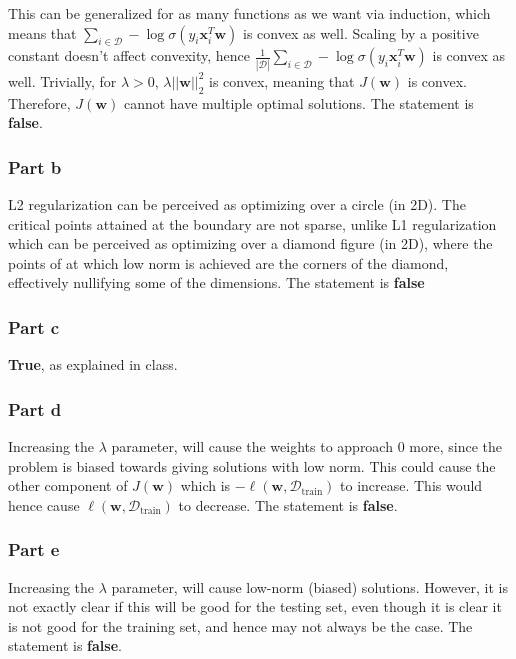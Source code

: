 \documentclass{article}
\newcommand{\vct}[1]{\mathbf{#1}}
\begin{document}
\begin{flushleft}
This can be generalized for as many functions as we want via induction, which means that \(\displaystyle\sum_{i \in \mathcal{D}} -\log \sigma(y_{i}\vct{x}_{i}^{T}\vct{w})\) is convex as well. Scaling by a positive constant doesn't affect convexity, hence \(\displaystyle\frac{1}{|\mathcal{D}|}\sum_{i \in \mathcal{D}} -\log \sigma(y_{i}\vct{x}_{i}^{T}\vct{w})\) is convex as well. Trivially, for \(\lambda > 0\), \(\lambda ||\vct{w}||_{2}^{2}\) is convex, meaning that \(J(\vct{w})\) is convex. Therefore, \(J(\vct{w})\) cannot have multiple optimal solutions. The statement is \textbf{false}.
\end{flushleft}

\subsubsection*{Part b}
L2 regularization can be perceived as optimizing over a circle (in 2D). The critical points attained at the boundary are not sparse, unlike L1 regularization which can be perceived as optimizing over a diamond figure (in 2D), where the points of at which low norm is achieved are the corners of the diamond, effectively nullifying some of the dimensions. The statement is \textbf{false}

\subsubsection*{Part c}
\textbf{True}, as explained in class.

\subsubsection*{Part d}
Increasing the \(\lambda\) parameter, will cause the weights to approach \(0\) more, since the problem is biased towards giving solutions with low norm. This could cause the other component of \(J(\vct{w})\) which is \(-\ell(\vct{w}, \mathcal{D}_{\text{train}})\) to increase. This would hence cause \(\ell(\vct{w}, \mathcal{D}_{\text{train}})\) to decrease. The statement is \textbf{false}.

\subsubsection*{Part e}
Increasing the \(\lambda\) parameter, will cause low-norm (biased) solutions. However, it is not exactly clear if this will be good for the testing set, even though it is clear it is not good for the training set, and hence may not always be the case. The statement is \textbf{false}.
\end{document}
